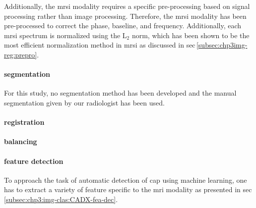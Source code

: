 \documentclass[num-refs]{wiley-article}
\begin{document}
Additionally, the \ac{mrsi} modality requires a specific pre-processing based on signal processing rather than image processing.
Therefore, the \ac{mrsi} modality has been pre-processed to correct the phase, baseline, and frequency.
Additionally, each \ac{mrsi} spectrum is normalized using the L$_2$ norm, which has been shown to be the most efficient normalization method in \ac{mrsi} as discussed in \acs{sec}\,\ref{subsec:chp3img-reg:prepro}.
\paragraph{segmentation}
For this study, no segmentation method has been developed and the manual segmentation given by our radiologist has been used.
\paragraph{registration}
\paragraph{balancing}
\paragraph{feature detection}

To approach the task of automatic detection of \ac{cap} using machine learning, one has to extract a variety of feature specific to the \ac{mri} modality as presented in \acs*{sec}\,\ref{subsec:chp3:img-clas:CADX-fea-dec}.
\end{document}
